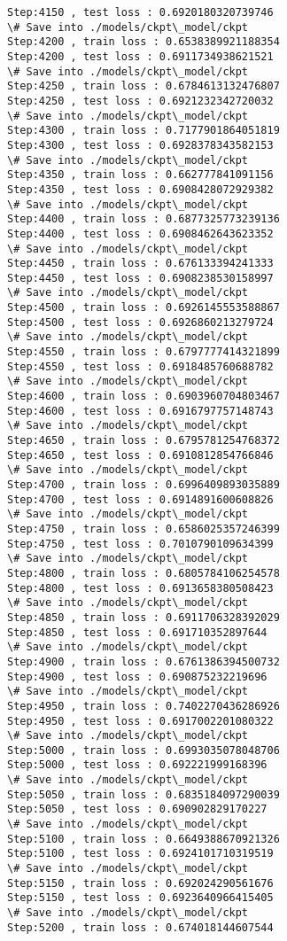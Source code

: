 \documentclass[11pt]{article}
\begin{document}
\begin{Verbatim}[commandchars=\\\{\}]
Step:4150 , test loss : 0.6920180320739746
\# Save into ./models/ckpt\_model/ckpt
Step:4200 , train loss : 0.6538389921188354
Step:4200 , test loss : 0.6911734938621521
\# Save into ./models/ckpt\_model/ckpt
Step:4250 , train loss : 0.6784613132476807
Step:4250 , test loss : 0.6921232342720032
\# Save into ./models/ckpt\_model/ckpt
Step:4300 , train loss : 0.7177901864051819
Step:4300 , test loss : 0.6928378343582153
\# Save into ./models/ckpt\_model/ckpt
Step:4350 , train loss : 0.662777841091156
Step:4350 , test loss : 0.6908428072929382
\# Save into ./models/ckpt\_model/ckpt
Step:4400 , train loss : 0.6877325773239136
Step:4400 , test loss : 0.6908462643623352
\# Save into ./models/ckpt\_model/ckpt
Step:4450 , train loss : 0.676133394241333
Step:4450 , test loss : 0.6908238530158997
\# Save into ./models/ckpt\_model/ckpt
Step:4500 , train loss : 0.6926145553588867
Step:4500 , test loss : 0.6926860213279724
\# Save into ./models/ckpt\_model/ckpt
Step:4550 , train loss : 0.6797777414321899
Step:4550 , test loss : 0.6918485760688782
\# Save into ./models/ckpt\_model/ckpt
Step:4600 , train loss : 0.6903960704803467
Step:4600 , test loss : 0.6916797757148743
\# Save into ./models/ckpt\_model/ckpt
Step:4650 , train loss : 0.6795781254768372
Step:4650 , test loss : 0.6910812854766846
\# Save into ./models/ckpt\_model/ckpt
Step:4700 , train loss : 0.6996409893035889
Step:4700 , test loss : 0.6914891600608826
\# Save into ./models/ckpt\_model/ckpt
Step:4750 , train loss : 0.6586025357246399
Step:4750 , test loss : 0.7010790109634399
\# Save into ./models/ckpt\_model/ckpt
Step:4800 , train loss : 0.6805784106254578
Step:4800 , test loss : 0.6913658380508423
\# Save into ./models/ckpt\_model/ckpt
Step:4850 , train loss : 0.6911706328392029
Step:4850 , test loss : 0.691710352897644
\# Save into ./models/ckpt\_model/ckpt
Step:4900 , train loss : 0.6761386394500732
Step:4900 , test loss : 0.690875232219696
\# Save into ./models/ckpt\_model/ckpt
Step:4950 , train loss : 0.7402270436286926
Step:4950 , test loss : 0.6917002201080322
\# Save into ./models/ckpt\_model/ckpt
Step:5000 , train loss : 0.6993035078048706
Step:5000 , test loss : 0.692221999168396
\# Save into ./models/ckpt\_model/ckpt
Step:5050 , train loss : 0.6835184097290039
Step:5050 , test loss : 0.690902829170227
\# Save into ./models/ckpt\_model/ckpt
Step:5100 , train loss : 0.6649388670921326
Step:5100 , test loss : 0.6924101710319519
\# Save into ./models/ckpt\_model/ckpt
Step:5150 , train loss : 0.692024290561676
Step:5150 , test loss : 0.6923640966415405
\# Save into ./models/ckpt\_model/ckpt
Step:5200 , train loss : 0.674018144607544

\end{Verbatim}
\end{document}
